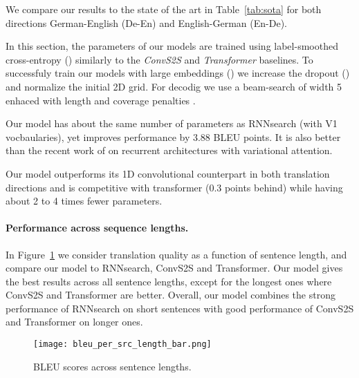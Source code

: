 \documentclass[11pt,a4paper]{article}
\def\fig#1{Figure~\ref{fig:#1}}
\def\tab#1{Table~\ref{tab:#1}}
\begin{document}
 
We compare our results to the state of the art in \tab{sota} for both directions German-English (De-En) and English-German (En-De).


In this section, the parameters of our models are trained using label-smoothed cross-entropy () similarly to the \textit{ConvS2S} and \textit{Transformer} baselines. To successfuly train our models with large embeddings () we increase the dropout () and normalize the initial 2D grid. For decodig we use a beam-search of width 5 enhaced with length and coverage penalties \citep{wu16arxiv}.


Our model has about the same number of parameters as RNNsearch (with V1 vocbaularies), yet improves  performance by 3.88 BLEU points.
It is also  better than the recent work of \citet{deng18arxiv} on recurrent architectures with variational attention.

Our model outperforms its 1D convolutional counterpart \citet{gehring17icml} in both translation directions and is competitive with transformer (0.3 points behind) while having about 2 to 4 times fewer parameters.



\paragraph{Performance across sequence lengths.}
In \fig{length} we consider translation quality as a function of 
sentence length, and compare our model to RNNsearch, ConvS2S and Transformer.
Our model gives the best results across all sentence lengths, except for the longest ones where ConvS2S and Transformer are better.
Overall, our model combines the strong performance of RNNsearch on short sentences with good performance of ConvS2S and Transformer on longer ones.



\begin{figure}
    \texttt{[image: bleu\_per\_src\_length\_bar.png]}
    \caption{BLEU scores across sentence lengths.}
    \label{fig:length}
\end{figure}
\end{document}
